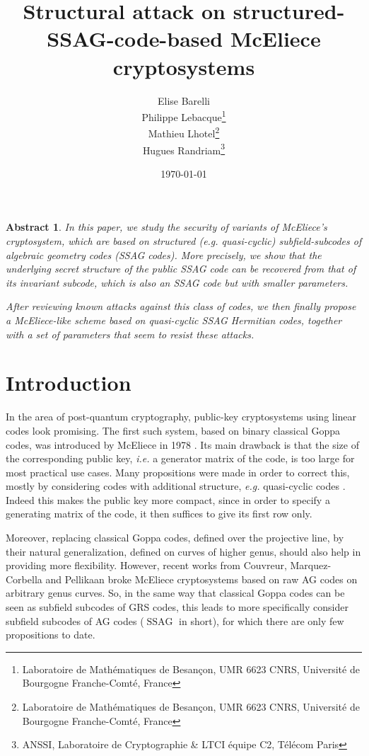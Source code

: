 \documentclass[10pt]{article}
\title{Structural attack on structured-SSAG-code-based McEliece cryptosystems}
\author{
Elise Barelli\\
Philippe Lebacque\footnote{Laboratoire de Mathématiques de Besançon, UMR 6623 CNRS, Université de Bourgogne Franche-Comté, France}\\
Mathieu Lhotel\footnote{Laboratoire de Mathématiques de Besançon, UMR 6623 CNRS, Université de Bourgogne Franche-Comté, France}\\
Hugues Randriam\footnote{ANSSI, Laboratoire de Cryptographie \& LTCI équipe C2, Télécom Paris}
}
\date{\today}
\newtheorem*{abs}{Abstract}
\theoremstyle{definition}
\theoremstyle{definition}
\theoremstyle{definition}
\newcommand{\ssag}{\operatorname{SSAG}}
\begin{document}
\maketitle

\begin{abs} 
  In this paper, we study the security of variants of McEliece's cryptosystem, which are based on structured (\textit{e.g.} quasi-cyclic) subfield-subcodes of algebraic geometry codes (SSAG codes).
  More precisely, we show that the underlying secret structure of the public SSAG code can be recovered from that of its invariant subcode, which is also an SSAG code but with smaller parameters.
  
  After reviewing known attacks against this class of codes, we then finally propose a McEliece-like scheme based on quasi-cyclic SSAG Hermitian codes, together with a set of parameters that seem to resist these attacks.
\end{abs}

\newpage


\section{Introduction}


In the area of post-quantum cryptography, public-key cryptosystems using linear codes look promising. The first such system, based on binary classical Goppa codes, was introduced by McEliece in 1978 \cite{McE}. Its main drawback is that the size of the corresponding public key, \textit{i.e.} a generator matrix of the code, is too large for most practical use cases. Many propositions were made in order to correct this, mostly by considering codes with additional structure, \textit{e.g.} quasi-cyclic codes \cite{BQ}.
Indeed this makes the public key more compact, since in order to specify a generating matrix of the code, it then suffices to give its first row only.

Moreover, replacing classical Goppa codes, defined over the projective line, by their natural generalization, defined on curves of higher genus, should also help in providing more flexibility. 
However, recent works from Couvreur, Marquez-Corbella and Pellikaan \cite{CMP} broke McEliece cryptosystems based on raw AG codes on arbitrary genus curves. So, in the same way that classical Goppa codes can be seen as subfield subcodes of GRS codes, this leads to more specifically consider subfield subcodes of AG codes ($\ssag$ in short), for which there are only few propositions to date. 
\end{document}
